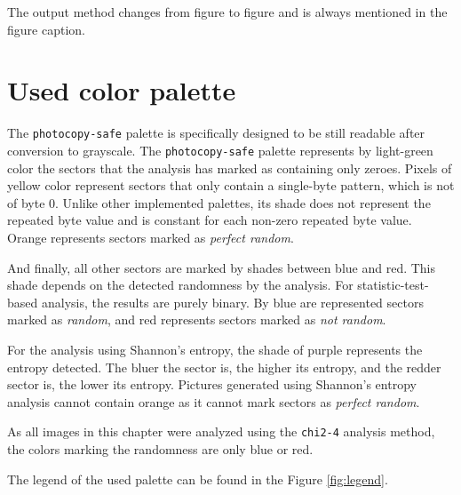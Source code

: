 \documentclass[
  digital, %
  color,   %
  oneside, %
  lof,     %
  nolot,     %
]{fithesis4}
\begin{document}
The output method changes from figure to figure and is always mentioned in the figure caption.

\section{Used color palette}
\label{sec:used-color-palette}

The \texttt{photocopy-safe} palette is specifically designed to be still readable after conversion to grayscale. 
The \texttt{photocopy-safe} palette represents by light-green color the sectors that the analysis has marked as containing only zeroes.
Pixels of yellow color represent sectors that only contain a single-byte pattern, which is not of byte 0.
Unlike other implemented palettes, its shade does not represent the repeated byte value and is constant for each non-zero repeated byte value.
Orange represents sectors marked as \emph{perfect random}.

And finally, all other sectors are marked by shades between blue and red.
This shade depends on the detected randomness by the analysis.
For statistic-test-based analysis, the results are purely binary.
By blue are represented sectors marked as \emph{random}, and red represents sectors marked as \emph{not random}.

For the analysis using Shannon's entropy, the shade of purple represents the entropy detected.
The bluer the sector is, the higher its entropy, and the redder sector is, the lower its entropy.
Pictures generated using Shannon's entropy analysis cannot contain orange as it cannot mark sectors as \emph{perfect random}.

As all images in this chapter were analyzed using the \texttt{chi2-4} analysis method, the colors marking the randomness are only blue or red.

The legend of the used palette can be found in the Figure \ref{fig:legend}.


\end{document}
